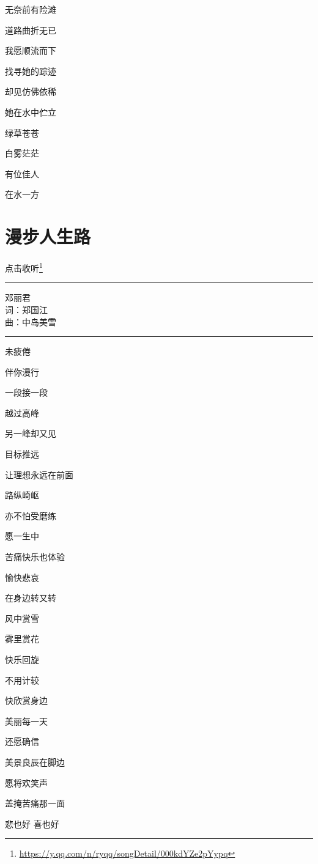 \documentclass[]{ctexbook}
\renewcommand{\href}[2]{#2\footnote{\url{#1}}}
\begin{document}
无奈前有险滩

道路曲折无已

我愿顺流而下

找寻她的踪迹

却见仿佛依稀

她在水中伫立

绿草苍苍

白雾茫茫

有位佳人

在水一方

\section*{漫步人生路}\label{walk-the-road-of-life}


\href{https://y.qq.com/n/ryqq/songDetail/000kdYZe2pYypq}{点击收听}

\begin{center}\rule{0.5\linewidth}{0.5pt}\end{center}

邓丽君\\
词：郑国江\\
曲：中岛美雪

\begin{center}\rule{0.5\linewidth}{0.5pt}\end{center}

未疲倦

伴你漫行

一段接一段

越过高峰

另一峰却又见

目标推远

让理想永远在前面

路纵崎岖

亦不怕受磨练

愿一生中

苦痛快乐也体验

愉快悲哀

在身边转又转

风中赏雪

雾里赏花

快乐回旋

不用计较

快欣赏身边

美丽每一天

还愿确信

美景良辰在脚边

愿将欢笑声

盖掩苦痛那一面

悲也好 喜也好
\end{document}
